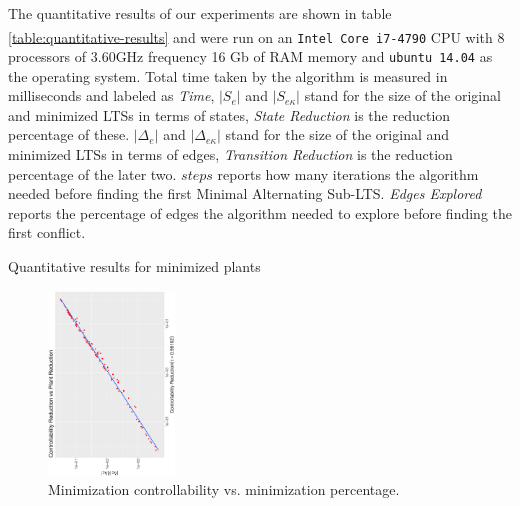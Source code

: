 

  
  
The quantitative results of our experiments are shown in table 
\ref{table:quantitative-results} and were run on an 
\texttt{Intel\textsuperscript{\textregistered} Core\textsuperscript{\texttrademark}
 i7-4790} CPU with 8 processors of 3.60GHz frequency
16 Gb of RAM memory and \texttt{ubuntu 14.04} as the operating system.
Total time taken by the algorithm is measured in milliseconds and
labeled as \emph{Time}, $|S_e|$ and $|S_{e\kappa}|$ stand for
the size of the original and minimized LTSs in terms of states,
\emph{State Reduction} is the reduction percentage of these.  
$|\Delta_e|$ and $|\Delta_{e\kappa}|$ stand for
the size of the original and minimized LTSs in terms of edges,
\emph{Transition Reduction} is the reduction percentage of the later two.  
$steps$ reports how many iterations the algorithm needed before finding
the first Minimal Alternating Sub-LTS. \emph{Edges Explored} reports the percentage of
edges the algorithm needed to explore before finding the first
conflict.
\begin{table}
	\resizebox{\textwidth}{!} {

}
  \caption{Quantitative results for minimized plants}
  \label{table:quantitative-results}
 \end{table}
\begin{figure}[bt]
	\centering
	\SmallPicture
\includegraphics[width=0.3\textwidth, angle=-90]{../experimental_setting/tmp_results/min_ctrl_vs_min_pct.ps}
	\vspace*{-2mm}
	\caption{Minimization controllability vs. minimization percentage.}
	\label{fig:min_ctr_vs_min_pct}
	\vspace*{-4mm}
	\MediumPicture
\end{figure}

